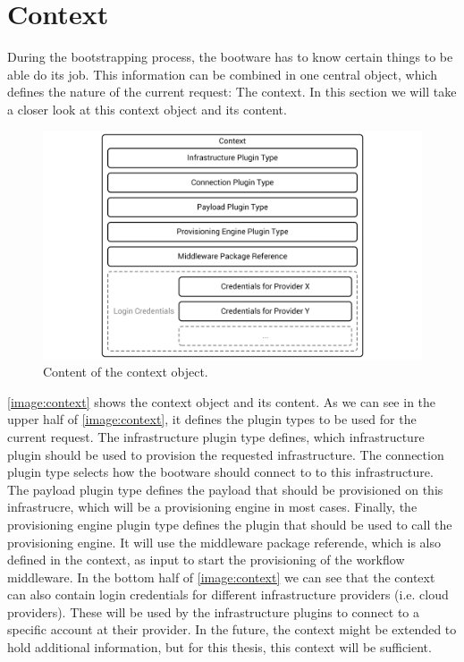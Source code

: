 \section{Context}
\label{design:context}

During the bootstrapping process, the bootware has to know certain things to be able do its job.
This information can be combined in one central object, which defines the nature of the current request: The context.
In this section we will take a closer look at this context object and its content.

\begin{figure}[!htbp]
	\centering
	\includegraphics[resolution=600]{design/assets/context}
	\caption{Content of the context object.}
	\label{image:context}
\end{figure}

\autoref{image:context} shows the context object and its content.
As we can see in the upper half of \autoref{image:context}, it defines the plugin types to be used for the current request.
The infrastructure plugin type defines, which infrastructure plugin should be used to provision the requested infrastructure.
The connection plugin type selects how the bootware should connect to to this infrastructure.
The payload plugin type defines the payload that should be provisioned on this infrastrucre, which will be a provisioning engine in most cases.
Finally, the provisioning engine plugin type defines the plugin that should be used to call the provisioning engine.
It will use the middleware package referende, which is also defined in the context, as input to start the provisioning of the workflow middleware.
In the bottom half of \autoref{image:context} we can see that the context can also contain login credentials for different infrastructure providers (i.e. cloud providers).
These will be used by the infrastructure plugins to connect to a specific account at their provider.
In the future, the context might be extended to hold additional information, but for this thesis, this context will be sufficient.

